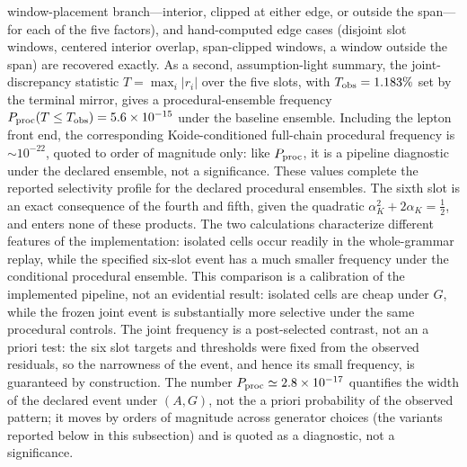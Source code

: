 \documentclass[aps,twocolumn,superscriptaddress,nofootinbib,floatfix]{revtex4-2}
\newcommand{\alphaK}{\alpha_K}
\begin{document}
window-placement branch---interior, clipped at either edge, or outside
the span---for each of the five factors), and hand-computed edge cases
(disjoint slot windows, centered interior overlap, span-clipped windows,
a window outside the span) are recovered
exactly. As a second, assumption-light summary, the
joint-discrepancy statistic $T=\max_i|r_i|$ over the five slots, with
$T_{\rm obs}=1.183\%$ set by the terminal mirror, gives a procedural-ensemble frequency $P_{\rm proc}(T\le T_{\rm obs})=5.6\times10^{-15}$ under the baseline ensemble. Including the lepton front end, the corresponding Koide-conditioned full-chain procedural frequency is $\sim10^{-22}$, quoted to order of magnitude only: like $P_{\rm proc}$, it is a pipeline diagnostic under the declared ensemble, not a significance. These values complete the reported selectivity profile for the declared procedural ensembles. The sixth slot is an exact consequence of the fourth and fifth, given the quadratic $\alphaK^2+2\alphaK=\tfrac12$, and enters none of these products. The two calculations characterize different features of the implementation: isolated cells occur readily in the whole-grammar replay, while the specified six-slot event has a much smaller frequency under the conditional procedural ensemble. This comparison is a calibration of the implemented pipeline, not an evidential result: isolated cells are cheap under $G$, while the frozen joint event is substantially more selective under the same procedural controls. The joint frequency is a post-selected contrast, not an a priori test: the six slot targets and thresholds were fixed from the observed residuals, so the narrowness of the event, and hence its small frequency, is guaranteed by construction. The number $P_{\rm proc}\simeq2.8\times10^{-17}$ quantifies the width of the declared event under $(A,G)$, not the a priori probability of the observed pattern; it moves by orders of magnitude across generator choices (the variants reported below in this subsection) and is quoted as a diagnostic, not a significance.
\end{document}
